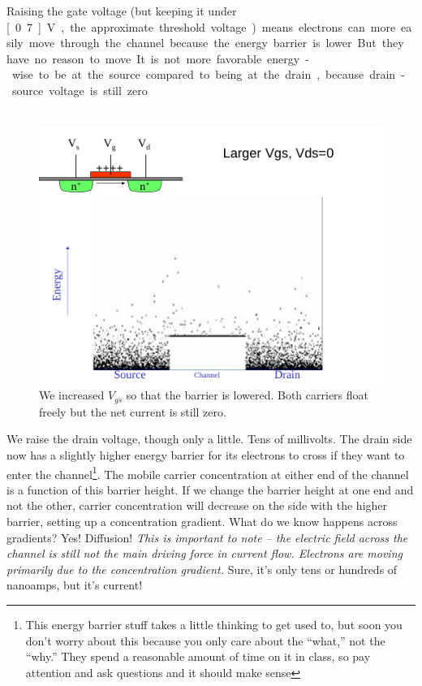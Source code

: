 \documentclass[main]{subfiles}
\begin{document}
 Raising the gate voltage (but keeping it under \unit[0.7]{V}, the approximate threshold voltage) means electrons can more easily move through the channel because the energy barrier is lower. But they have no reason to move. It is not more favorable energy-wise to be at the source compared to being at the drain, because drain-source voltage is still zero.\\ \\
\begin{figure}[H]
\centering
\includegraphics[scale=1]{figs/larger_vgs_transistor.pdf}
\caption{We increased $V_{gs}$ so that the barrier is lowered. Both carriers float freely but the net current is still zero.}
\end{figure}
We raise the drain voltage, though only a little. Tens of millivolts. The drain side now has a slightly higher energy barrier for its electrons to cross if they want to enter the channel\footnote{This energy barrier stuff takes a little thinking to get used to, but soon you don't worry about this because you only care about the ``what,'' not the ``why.'' They spend a reasonable amount of time on it in class, so pay attention and ask questions and it should make sense}. The mobile carrier concentration at either end of the channel is a function of this barrier height. If we change the barrier height at one end and not the other, carrier concentration will decrease on the side with the higher barrier, setting up a concentration gradient. What do we know happens across gradients? Yes! Diffusion! \emph{This is important to note – the electric field across the channel is still not the main driving force in current flow. Electrons are moving primarily due to the concentration gradient.} Sure, it's only tens or hundreds of nanoamps, but it's current!\\ 
\end{document}
